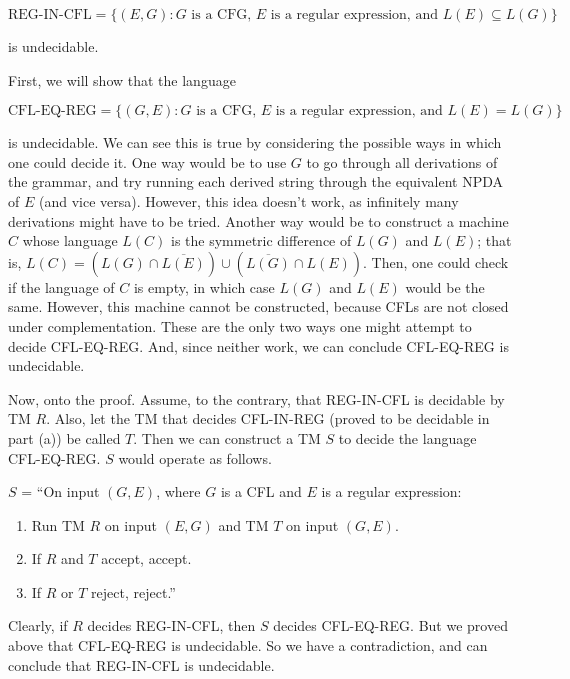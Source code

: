 \documentclass{article}
\begin{document}
\begin{description}
    \[ \text{REG-IN-CFL} = \{(E, G) : \text{$G$ is a CFG, $E$ is a regular
    expression, and } L(E) \subseteq L(G)\} \]

    is undecidable.

    First, we will show that the language

    \[ \text{CFL-EQ-REG} = \{(G, E) : \text{$G$ is a CFG, $E$ is a regular
    expression, and } L(E) = L(G)\} \]

    is undecidable. We can see this is true by considering the possible ways
    in which one could decide it. One way would be to use $G$ to go
    through all derivations of the grammar, and try running each derived
    string through the equivalent NPDA of $E$ (and vice versa).
    However, this idea
    doesn't work, as infinitely many derivations might have to be tried.
    Another way would be to construct a machine $C$ whose language $L(C)$
    is the symmetric difference of $L(G)$ and $L(E)$; that is,
    $L(C) = (L(G) \cap \overline{L(E)}) \cup (\overline{L(G)} \cap L(E))$.
    Then, one could check if the language of $C$ is empty, in which case
    $L(G)$ and $L(E)$ would be the same. However, this machine cannot be
    constructed, because CFLs are not closed under complementation. These
    are the only two ways one might attempt to decide CFL-EQ-REG. And, since
    neither work, we can conclude CFL-EQ-REG is undecidable.

    Now, onto the proof. Assume, to the contrary, that REG-IN-CFL is decidable
    by TM $R$. Also, let the TM that decides CFL-IN-REG (proved to be
    decidable in part (a)) be called $T$.  Then we can construct a TM $S$ to
    decide the language CFL-EQ-REG.
    \newpage
    $S$ would operate as follows.

    $S$ = ``On input $(G, E)$, where $G$ is a CFL and $E$ is a regular
    expression:
    \begin{enumerate}
        \item Run TM $R$ on input $(E, G)$ and TM $T$ on input $(G, E)$.
        \item If $R$ and $T$ accept, accept.
        \item If $R$ or $T$ reject, reject.''
    \end{enumerate}

    Clearly, if $R$ decides REG-IN-CFL, then $S$ decides CFL-EQ-REG. But we
    proved above that CFL-EQ-REG is undecidable. So we have a contradiction,
    and can conclude that REG-IN-CFL is undecidable.
\end{description}
\newpage
\end{document}
